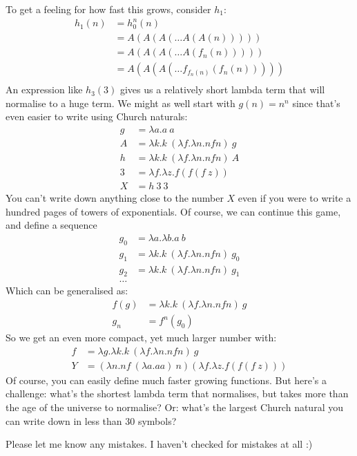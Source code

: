 \documentclass[a4paper, 11pt]{article}
\theoremstyle{definition}
\begin{document}
To get a feeling for how fast this grows, consider $h_1$:
\begin{align*}
  h_1(n) &= h_0^n(n)\\
         &= A(A(A(\dots A(A(n)))))\\
         &= A(A(A(\dots A(f_n(n)))))\\
         &= A(A(A(\dots f_{f_n(n)}(f_n(n)))))\\
\end{align*}
An expression like $h_3(3)$ gives us a relatively short lambda term that will normalise to a huge term. We might as well start with $g(n) = n^n$ since that's even easier to write using Church naturals:
\begin{align*}
  g &= \lambda a. a\ a\\
  A &= \lambda k. k\ (\lambda f. \lambda n. n f n)\ g\\
  h &= \lambda k. k\ (\lambda f. \lambda n. n f n)\ A\\
  3 &= \lambda f. \lambda z. f (f (f\ z))\\
  X &= h\ 3\ 3
\end{align*}
You can't write down anything close to the number $X$ even if you were to write a hundred pages of towers of exponentials. Of course, we can continue this game, and define a sequence
\begin{align*}
  g_0 &= \lambda a. \lambda b. a\ b\\
  g_1 &= \lambda k. k\ (\lambda f. \lambda n. n f n)\ g_0\\
  g_2 &= \lambda k. k\ (\lambda f. \lambda n. n f n)\ g_1\\
  \dots
\end{align*}
Which can be generalised as:
\begin{align*}
  f(g) &= \lambda k. k\ (\lambda f. \lambda n. n f n)\ g\\
  g_n &= f^n(g_0)
\end{align*}
So we get an even more compact, yet much larger number with:
\begin{align*}
  f &= \lambda g. \lambda k. k\ (\lambda f. \lambda n. n f n)\ g\\
  Y &= (\lambda n. n f\ (\lambda a. a a)\ n) (\lambda f. \lambda z. f (f (f\ z)))
\end{align*}
Of course, you can easily define much faster growing functions. But here's a challenge: what's the shortest lambda term that normalises, but takes more than the age of the universe to normalise? Or: what's the largest Church natural you can write down in less than 30 symbols?

Please let me know any mistakes. I haven't checked for mistakes at all :)
\end{document}
